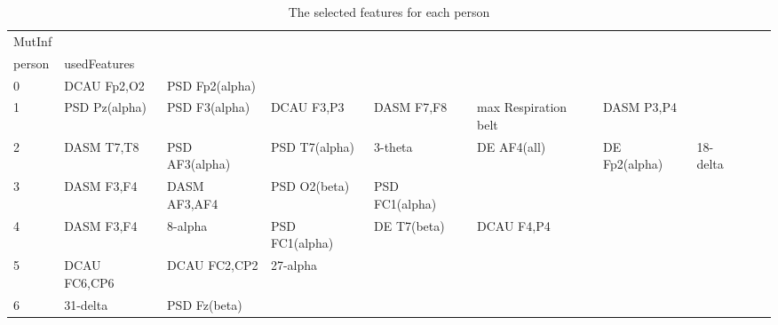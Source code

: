 \begin{landscape}
\begin{table}[]
\centering
\caption{The selected features for each person}
\begin{tabular}{l|llllllll}
MutInf   &                       &                       &                      &                         &                         &                      &                      &                       &                       &                    \\
person   & usedFeatures          &                       &                      &                         &                         &                      &                      &                       &                       &                    \\
0        & DCAU Fp2,O2           & PSD Fp2(alpha)        &                      &                         &                         &                      &                      &                       &                       &                    \\
1        & PSD Pz(alpha)         & PSD F3(alpha)         & DCAU F3,P3           & DASM F7,F8              & max Respiration belt    & DASM P3,P4           &                      &                       &                       &                    \\
2        & DASM T7,T8            & PSD AF3(alpha)        & PSD T7(alpha)        & 3-theta                 & DE AF4(all)             & DE Fp2(alpha)        & 18-delta             &                       &                       &                    \\
3        & DASM F3,F4            & DASM AF3,AF4          & PSD O2(beta)         & PSD FC1(alpha)          &                         &                      &                      &                       &                       &                    \\
4        & DASM F3,F4            & 8-alpha               & PSD FC1(alpha)       & DE T7(beta)             & DCAU F4,P4              &                      &                      &                       &                       &                    \\
5        & DCAU FC6,CP6          & DCAU FC2,CP2          & 27-alpha             &                         &                         &                      &                      &                       &                       &                    \\
6        & 31-delta              & PSD Fz(beta)          &                      &                         &                         &                      &                      &                       &                       &                    \\

\end{tabular}
\end{table}
\end{landscape}
